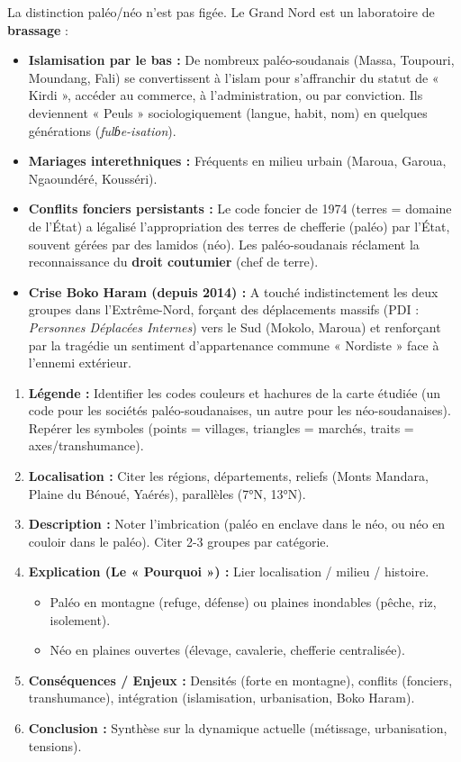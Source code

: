 \documentclass[11pt]{article}
\begin{document}
La distinction paléo/néo n'est pas figée. Le Grand Nord est un laboratoire de \textbf{brassage} :
\begin{itemize}
    \item \textbf{Islamisation par le bas :} De nombreux paléo-soudanais (Massa, Toupouri, Moundang, Fali) se convertissent à l'islam pour s'affranchir du statut de « Kirdi », accéder au commerce, à l'administration, ou par conviction. Ils deviennent « Peuls » sociologiquement (langue, habit, nom) en quelques générations (\emph{fulɓe-isation}).
    \item \textbf{Mariages interethniques :} Fréquents en milieu urbain (Maroua, Garoua, Ngaoundéré, Kousséri).
    \item \textbf{Conflits fonciers persistants :} Le code foncier de 1974 (terres = domaine de l'État) a légalisé l'appropriation des terres de chefferie (paléo) par l'État, souvent gérées par des lamidos (néo). Les paléo-soudanais réclament la reconnaissance du \textbf{droit coutumier} (chef de terre).
    \item \textbf{Crise Boko Haram (depuis 2014) :} A touché indistinctement les deux groupes dans l'Extrême-Nord, forçant des déplacements massifs (PDI : \emph{Personnes Déplacées Internes}) vers le Sud (Mokolo, Maroua) et renforçant par la tragédie un sentiment d'appartenance commune « Nordiste » face à l'ennemi extérieur.
\end{itemize}

\begin{methode}
\begin{enumerate}
    \item \textbf{Légende :} Identifier les codes couleurs et hachures de la carte étudiée (un code pour les sociétés paléo-soudanaises, un autre pour les néo-soudanaises). Repérer les symboles (points = villages, triangles = marchés, traits = axes/transhumance).
    \item \textbf{Localisation :} Citer les régions, départements, reliefs (Monts Mandara, Plaine du Bénoué, Yaérés), parallèles (7°N, 13°N).
    \item \textbf{Description :} Noter l'imbrication (paléo en enclave dans le néo, ou néo en couloir dans le paléo). Citer 2-3 groupes par catégorie.
    \item \textbf{Explication (Le « Pourquoi ») :} Lier localisation / milieu / histoire.
        \begin{itemize}
            \item Paléo en montagne (refuge, défense) ou plaines inondables (pêche, riz, isolement).
            \item Néo en plaines ouvertes (élevage, cavalerie, chefferie centralisée).
        \end{itemize}
    \item \textbf{Conséquences / Enjeux :} Densités (forte en montagne), conflits (fonciers, transhumance), intégration (islamisation, urbanisation, Boko Haram).
    \item \textbf{Conclusion :} Synthèse sur la dynamique actuelle (métissage, urbanisation, tensions).
\end{enumerate}
\end{methode}
\end{document}
